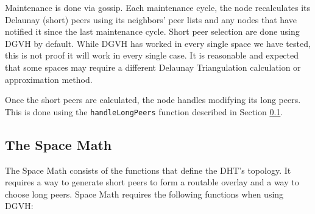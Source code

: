 \documentclass[11pt,conference]{IEEEtran}
\begin{document}
Maintenance is done via gossip.
Each maintenance cycle, the node recalculates its Delaunay (short) peers using its neighbors' peer lists and any nodes that have notified it since the last maintenance cycle.
Short peer selection are done using DGVH by default.
While DGVH has worked in every single space we have tested, this is not proof it will work in every single case.
It is reasonable and expected that some spaces may require a different Delaunay Triangulation calculation or approximation method.

Once the short peers are calculated, the node handles modifying its long peers.
This is done using the \texttt{handleLongPeers} function described in Section \ref{sec:space}.

\subsection{The Space Math}
\label{sec:space}
The Space Math consists of the functions that define the DHT's topology.
It requires a way to generate short peers to form a routable overlay and a way to choose long peers.
Space Math requires the following functions when using DGVH:
\end{document}
